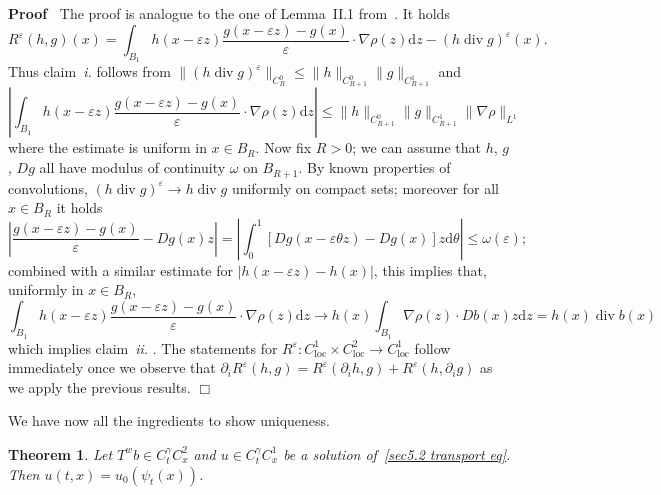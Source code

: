 \documentclass[10pt]{article}
\newcommand{\mathd}{\mathrm{d}}
\newcommand{\tmop}[1]{\ensuremath{\operatorname{#1}}}
\newcommand{\tmtextit}[1]{{\itshape{#1}}}
\newenvironment{proof}{\noindent\textbf{Proof\ }}{\hspace*{\fill}$\Box$\medskip}
\newtheorem{theorem}{Theorem}
\begin{document}
\begin{proof}
  The proof is analogue to the one of Lemma~II.1 from~{\cite{diperna}}. It
  holds
  \[ R^{\varepsilon} (h, g) (x) = \int_{B_1} h (x - \varepsilon z) \frac{g (x
     - \varepsilon z) - g (x)}{\varepsilon} \cdot \nabla \rho (z) \mathd z -
     (h \tmop{div} g)^{\varepsilon} (x) . \]
  Thus claim~\tmtextit{i.} follows from $\| (h \tmop{div} g)^{\varepsilon}
  \|_{C_R^0} \leqslant \| h \|_{C_{R + 1}^0} \| g \|_{C_{R + 1}^1}$ and
  \[ \left| \int_{B_1} h (x - \varepsilon z) \frac{g (x - \varepsilon z) - g
     (x)}{\varepsilon} \cdot \nabla \rho (z) \mathd z \right| \leqslant \| h
     \|_{C_{R + 1}^0} \| g \|_{C_{R + 1}^1} \| \nabla \rho \|_{L^1} \]
  where the estimate is uniform in $x \in B_R$. Now fix $R > 0$; we can assume
  that $h$, $g$, $D g$ all have modulus of continuity $\omega$ on $B_{R + 1}$.
  By known properties of convolutions, $(h \tmop{div} g)^{\varepsilon}
  \rightarrow h \tmop{div} g$ uniformly on compact sets; moreover for all $x
  \in B_R$ it holds
  \[ \left| \frac{g (x - \varepsilon z) - g (x)}{\varepsilon} - D g (x) z
     \right| = \left| \int_0^1 [D g (x - \varepsilon \theta z) - D g (x)] z
     \mathd \theta \right| \leqslant \omega (\varepsilon) ; \]
  combined with a similar estimate for $| h (x - \varepsilon z) - h (x) |$,
  this implies that, uniformly in $x \in B_R$,
  \[ \int_{B_1} h (x - \varepsilon z) \frac{g (x - \varepsilon z) - g
     (x)}{\varepsilon} \cdot \nabla \rho (z) \mathd z \rightarrow h (x) 
     \int_{B_1} \nabla \rho (z) \cdot D b (x) z \mathd z = h (x) \tmop{div} b
     (x) \]
  which implies claim~\tmtextit{ii.} . The statements for $R^{\varepsilon} :
  C_{\tmop{loc}}^1 \times C_{\tmop{loc}}^2 \rightarrow C_{\tmop{loc}}^1$
  follow immediately once we observe that $\partial_i R^{\varepsilon} (h, g) =
  R^{\varepsilon} (\partial_i h, g) + R^{\varepsilon} (h, \partial_i g)$ as we
  apply the previous results.
\end{proof}

We have now all the ingredients to show uniqueness.

\begin{theorem}
  \label{sec5.2 thm uniqueness transport}Let $T^w b \in C^{\gamma}_t C^2_x$
  and $u \in C^{\gamma}_t C^1_x$ be a solution of~{\eqref{sec5.2 transport
  eq}}. Then $u (t, x) = u_0 (\psi_t (x))$.
\end{theorem}
\end{document}
